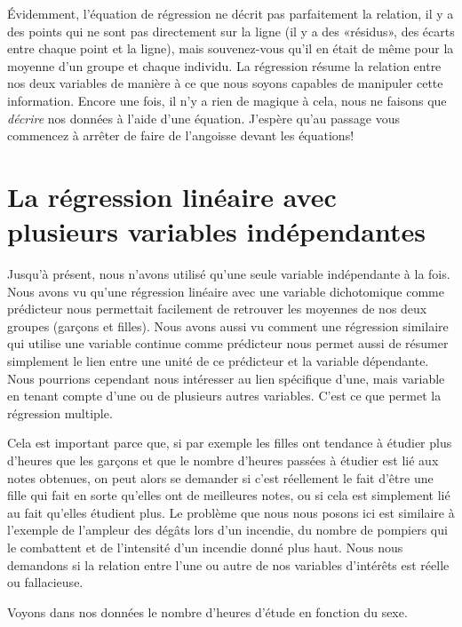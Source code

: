 \documentclass[
]{book}
\begin{document}
Évidemment, l'équation de régression ne décrit pas parfaitement la relation, il y a des points qui ne sont pas directement sur la ligne (il y a des «résidus», des écarts entre chaque point et la ligne), mais souvenez-vous qu'il en était de même pour la moyenne d'un groupe et chaque individu. La régression résume la relation entre nos deux variables de manière à ce que nous soyons capables de manipuler cette information. Encore une fois, il n'y a rien de magique à cela, nous ne faisons que \emph{décrire} nos données à l'aide d'une équation. J'espère qu'au passage vous commencez à arrêter de faire de l'angoisse devant les équations!

\hypertarget{la-ruxe9gression-linuxe9aire-avec-plusieurs-variables-induxe9pendantes}{%
\section{La régression linéaire avec plusieurs variables indépendantes}\label{la-ruxe9gression-linuxe9aire-avec-plusieurs-variables-induxe9pendantes}}

Jusqu'à présent, nous n'avons utilisé qu'une seule variable indépendante à la fois. Nous avons vu qu'une régression linéaire avec une variable dichotomique comme prédicteur nous permettait facilement de retrouver les moyennes de nos deux groupes (garçons et filles). Nous avons aussi vu comment une régression similaire qui utilise une variable continue comme prédicteur nous permet aussi de résumer simplement le lien entre une unité de ce prédicteur et la variable dépendante. Nous pourrions cependant nous intéresser au lien spécifique d'une, mais variable en tenant compte d'une ou de plusieurs autres variables. C'est ce que permet la régression multiple.

Cela est important parce que, si par exemple les filles ont tendance à étudier plus d'heures que les garçons et que le nombre d'heures passées à étudier est lié aux notes obtenues, on peut alors se demander si c'est réellement le fait d'être une fille qui fait en sorte qu'elles ont de meilleures notes, ou si cela est simplement lié au fait qu'elles étudient plus. Le problème que nous nous posons ici est similaire à l'exemple de l'ampleur des dégâts lors d'un incendie, du nombre de pompiers qui le combattent et de l'intensité d'un incendie donné plus haut. Nous nous demandons si la relation entre l'une ou autre de nos variables d'intérêts est réelle ou fallacieuse.

Voyons dans nos données le nombre d'heures d'étude en fonction du sexe.
\end{document}
